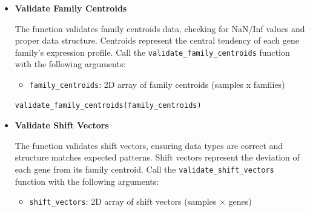 \documentclass[11pt]{article}
\begin{document}
\begin{enumerate}
\begin{itemize}
\begin{itemize}
	      	      	\item \textbf{(Optional)} \texttt{check\_non\_negative}: Whether to
	      	      	      check for non-negative values (default: True)
	      	      \end{itemize}
	      	      
	      	      \begin{lstlisting}[language=Python, caption={Python Validate Expression Data}]
validate_expression_data(expression_vectors, check_non_negative=True)
	      	      \end{lstlisting}
	      	      
	      	\item \textbf{Validate Family Centroids}
	      	      
	      	      The function validates family centroids data, checking for NaN/Inf
	      	      values and proper data structure. Centroids represent the central tendency
	      	      of each gene family's expression profile. Call the \texttt{validate\_family\_centroids}
	      	      function with the following arguments:
	      	      
	      	      \begin{itemize}
	      	      	\item \texttt{family\_centroids}: 2D array of family centroids (samples
	      	      	      x families)
	      	      \end{itemize}
	      	      
	      	      \begin{lstlisting}[language=Python, caption={Python Validate Family Centroids}]
validate_family_centroids(family_centroids)
	      	      \end{lstlisting}
	      	      
	      	\item \textbf{Validate Shift Vectors}
	      	      
	      	      The function validates shift vectors, ensuring data types are correct
	      	      and structure matches expected patterns. Shift vectors represent the deviation
	      	      of each gene from its family centroid. Call the \texttt{validate\_shift\_vectors}
	      	      function with the following arguments:
	      	      
	      	      \begin{itemize}
	      	      	\item \texttt{shift\_vectors}: 2D array of shift vectors (samples ×
	      	      	      genes)
	      	      	      

\end{itemize}
\end{itemize}
\end{enumerate}
\end{document}
